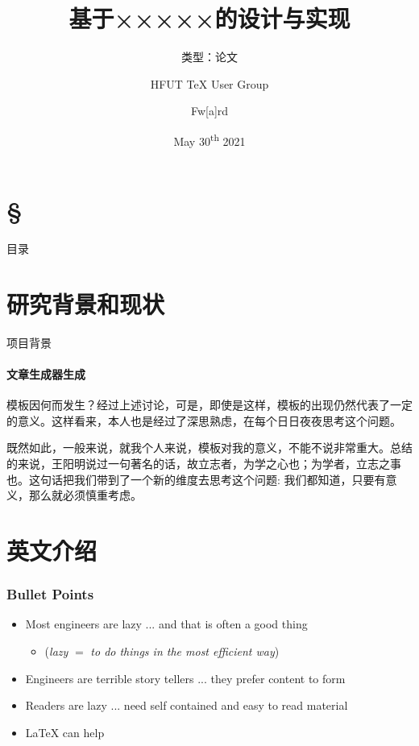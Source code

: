 \documentclass[aspectratio=169]{beamer}
\title{基于×××××的设计与实现}
\subtitle{类型：论文}
\author[{Fw[a]rd}]{HFUT \TeX{} User Group \and Fw[a]rd}
\institute{HFUT \TeX{} User Group}
\date{May 30\textsuperscript{th} 2021}
\begin{document}
\begin{frame}
	\maketitle
\end{frame}

\section*{\S}
\begin{frame}{目录}
	\tableofcontents
\end{frame}

\section{研究背景和现状}

\begin{frame}{项目背景}
    \framesubtitle{文章生成器生成}
{
    \setlength{\parskip}{6pt}
    \setlength{\parindent}{2em}
模板因何而发生？经过上述讨论，可是，即使是这样，模板的出现仍然代表了一定的意义。这样看来，本人也是经过了深思熟虑，在每个日日夜夜思考这个问题。

既然如此，一般来说，就我个人来说，模板对我的意义，不能不说非常重大。总结的来说，王阳明说过一句著名的话，故立志者，为学之心也；为学者，立志之事也。这句话把我们带到了一个新的维度去思考这个问题: 我们都知道，只要有意义，那么就必须慎重考虑。 
}
\end{frame}

\section{英文介绍}
\begin{frame}
\frametitle{Bullet Points}
\vspace{-0.3cm}
\begin{itemize}[<+->]
	\item Most engineers are lazy ... and that is often a good thing
	\begin{itemize}[<+->]
		\item (\textit{lazy} $=$ \textit{to do things in the most efficient way})
	\end{itemize}
	\item Engineers are terrible story tellers ... they prefer content to form
	\item Readers are lazy ... need self contained and easy to read material
	\item \LaTeX{} can help
\end{itemize}
\end{frame}
\end{document}
